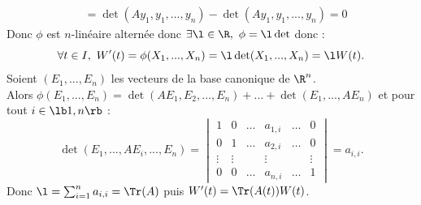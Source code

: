 \documentclass[11pt]{article}
\begin{document}
\begin{exercice}{}{}
\begin{align*}
        &=\det(Ay_1,y_1,...,y_n) - \det(Ay_1,y_1, ..., y_n) = 0
    \end{align*}
    Donc $\phi$ est $n$-linéaire alternée donc $\exists \l \in \R, ~ \phi = \l \det$ donc :
    \begin{equation*}
        \forall t \in I, ~ W'(t) = \phi(X_1,...,X_n) = \l\det(X_1,...,X_n) = \l W(t).
    \end{equation*}
    Soient $(E_1,...,E_n)$ les vecteurs de la base canonique de $\R^n$.\\
    Alors $\phi(E_1,...,E_n) = \det(AE_1, E_2, ..., E_n) + ... + \det(E_1,..., AE_n)$ et pour tout $i\in\lb1,n\rb$ :
    \begin{equation*}
        \det(E_1,..., AE_i, ..., E_n) = \begin{vmatrix}1 & 0 & \dots & a_{1,i} & \dots & 0 \\ 0 & 1 & \dots & a_{2,i} & \dots & 0 \\ \vdots & \vdots & & \vdots & & \vdots \\ 0 & 0 & \dots & a_{n,i} & \dots & 1\end{vmatrix} = a_{i,i}.
    \end{equation*}
    Donc $\l=\sum_{i=1}^n a_{i,i}=\Tr(A)$ puis $W'(t)=\Tr(A(t))W(t)$.
\end{exercice}

\pagebreak
\end{document}
